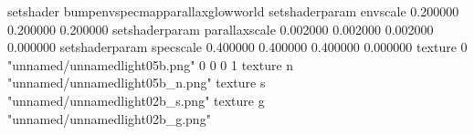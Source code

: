 setshader bumpenvspecmapparallaxglowworld
setshaderparam envscale 0.200000 0.200000 0.200000
setshaderparam parallaxscale 0.002000 0.002000 0.002000 0.000000
setshaderparam specscale 0.400000 0.400000 0.400000 0.000000
texture 0 "unnamed/unnamedlight05b.png" 0 0 0 1
texture n "unnamed/unnamedlight05b_n.png"
texture s "unnamed/unnamedlight02b_s.png"
texture g "unnamed/unnamedlight02b_g.png"